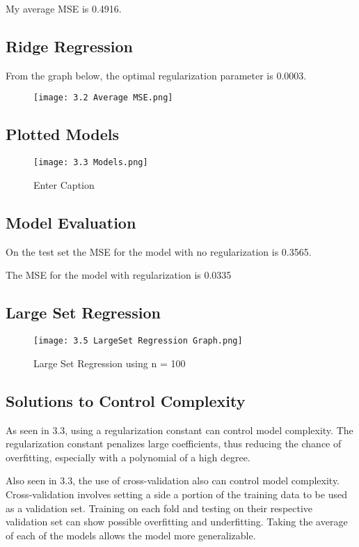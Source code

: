 \documentclass{article}
\begin{document}
My average MSE is 0.4916.

\subsection{Ridge Regression}
From the graph below, the optimal regularization parameter is 0.0003.
\begin{figure}[H]
    \centering
    \texttt{[image: 3.2 Average MSE.png]}
\end{figure}

\subsection{Plotted Models}
\begin{figure}[H]
    \centering
    \texttt{[image: 3.3 Models.png]}
    \caption{Enter Caption}
    \label{fig:enter-label}
\end{figure}

\subsection{Model Evaluation}
On the test set the MSE for the model with no regularization is 0.3565.  

The MSE for the model with regularization is 0.0335

\subsection{Large Set Regression}

\begin{figure}[H]
    \centering
    \texttt{[image: 3.5 LargeSet Regression Graph.png]}
    \caption{Large Set Regression using n = 100}
\end{figure}

\subsection{Solutions to Control Complexity}
As seen in 3.3, using a regularization constant can control model complexity. The regularization constant penalizes large coefficients, thus reducing the chance of overfitting, especially with a polynomial of a high degree.

Also seen in 3.3, the use of cross-validation also can control model complexity. Cross-validation involves setting a side a portion of the training data to be used as a validation set. Training on each fold and testing on their respective validation set can show possible overfitting and underfitting. Taking the average of each of the models allows the model more generalizable.
\end{document}
